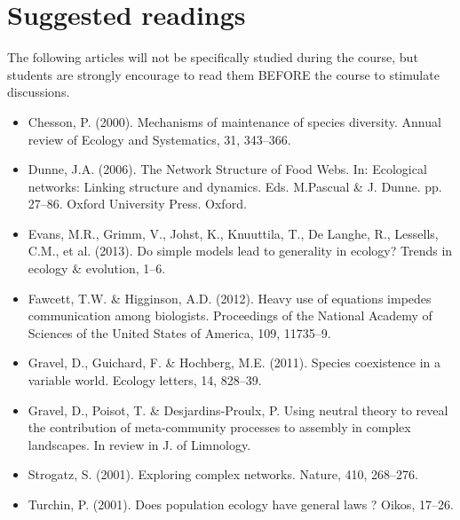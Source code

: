 \documentclass[11]{article}
\begin{document}
	\section*{Suggested readings}

The following articles will not be specifically studied during the course, but students are strongly encourage to read them BEFORE the course to stimulate discussions. 

	\begin{itemize}
		\item Chesson, P. (2000). Mechanisms of maintenance of species diversity. Annual review of Ecology and Systematics, 31, 343–366.
		\item Dunne, J.A. (2006). The Network Structure of Food Webs. In: Ecological networks: Linking structure and dynamics. Eds. M.Pascual \& J. Dunne. pp. 27–86. Oxford University Press. Oxford.
		\item  Evans, M.R., Grimm, V., Johst, K., Knuuttila, T., De Langhe, R., Lessells, C.M., et al. (2013). Do simple models lead to generality in ecology? Trends in ecology \& evolution, 1–6.
		\item Fawcett, T.W. \& Higginson, A.D. (2012). Heavy use of equations impedes communication among biologists. Proceedings of the National Academy of Sciences of the United States of America, 109, 11735–9.
		\item Gravel, D., Guichard, F. \& Hochberg, M.E. (2011). Species coexistence in a variable world. Ecology letters, 14, 828–39.
		\item Gravel, D., Poisot, T. \& Desjardins-Proulx, P. Using neutral theory to reveal the contribution of meta-community processes to assembly in complex landscapes. In review in J. of Limnology. 
		\item Strogatz, S. (2001). Exploring complex networks. Nature, 410, 268–276.
		\item Turchin, P. (2001). Does population ecology have general laws ? Oikos, 17–26.
	\end{itemize}
\end{document}

